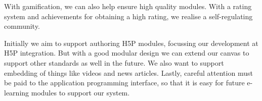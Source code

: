 With gamification, we can also help ensure high quality modules. With a rating 
system and achievements for obtaining a high rating, we realise a 
self-regulating community.

Initially we aim to support authoring H5P modules, focussing our development 
at H5P integration. But with a good modular design we can extend our canvas to 
support other standards as well in the future. We also want to support 
embedding of things like videos and news articles. Lastly, careful attention 
must be paid to the application programming interface, so that it is easy for 
future e-learning modules to support our system.

